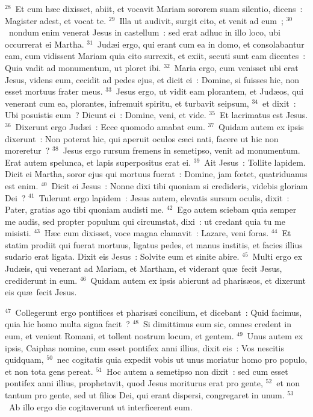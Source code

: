 ${}^{28}$~Et cum h\ae c dixisset, abiit, et vocavit Mariam sororem suam silentio, dicens~: Magister adest, et vocat te.
${}^{29}$~Illa ut audivit, surgit cito, et venit ad eum~;
${}^{30}$~nondum enim venerat Jesus in castellum~: sed erat adhuc in illo loco, ubi occurrerat ei Martha.
${}^{31}$~Jud\ae i ergo, qui erant cum ea in domo, et consolabantur eam, cum vidissent Mariam quia cito surrexit, et exiit, secuti sunt eam dicentes~: Quia vadit ad monumentum, ut ploret ibi.
${}^{32}$~Maria ergo, cum venisset ubi erat Jesus, videns eum, cecidit ad pedes ejus, et dicit ei~: Domine, si fuisses hic, non esset mortuus frater meus.
${}^{33}$~Jesus ergo, ut vidit eam plorantem, et Jud\ae os, qui venerant cum ea, plorantes, infremuit spiritu, et turbavit seipsum,
${}^{34}$~et dixit~: Ubi posuistis eum~? Dicunt ei~: Domine, veni, et vide.
${}^{35}$~Et lacrimatus est Jesus.
${}^{36}$~Dixerunt ergo Jud\ae i~: Ecce quomodo amabat eum.
${}^{37}$~Quidam autem ex ipsis dixerunt~: Non poterat hic, qui aperuit oculos c\ae ci nati, facere ut hic non moreretur~?
${}^{38}$~Jesus ergo rursum fremens in semetipso, venit ad monumentum. Erat autem spelunca, et lapis superpositus erat ei.
${}^{39}$~Ait Jesus~: Tollite lapidem. Dicit ei Martha, soror ejus qui mortuus fuerat~: Domine, jam fœtet, quatriduanus est enim.
${}^{40}$~Dicit ei Jesus~: Nonne dixi tibi quoniam si credideris, videbis gloriam Dei~?
${}^{41}$~Tulerunt ergo lapidem~: Jesus autem, elevatis sursum oculis, dixit~: Pater, gratias ago tibi quoniam audisti me.
${}^{42}$~Ego autem sciebam quia semper me audis, sed propter populum qui circumstat, dixi~: ut credant quia tu me misisti.
${}^{43}$~H\ae c cum dixisset, voce magna clamavit~: Lazare, veni foras.
${}^{44}$~Et statim prodiit qui fuerat mortuus, ligatus pedes, et manus institis, et facies illius sudario erat ligata. Dixit eis Jesus~: Solvite eum et sinite abire.
${}^{45}$~Multi ergo ex Jud\ae is, qui venerant ad Mariam, et Martham, et viderant qu\ae\ fecit Jesus, crediderunt in eum.
${}^{46}$~Quidam autem ex ipsis abierunt ad pharis\ae os, et dixerunt eis qu\ae\ fecit Jesus.


${}^{47}$~Collegerunt ergo pontifices et pharis\ae i concilium, et dicebant~: Quid facimus, quia hic homo multa signa facit~?
${}^{48}$~Si dimittimus eum sic, omnes credent in eum, et venient Romani, et tollent nostrum locum, et gentem.
${}^{49}$~Unus autem ex ipsis, Caiphas nomine, cum esset pontifex anni illius, dixit eis~: Vos nescitis quidquam,
${}^{50}$~nec cogitatis quia expedit vobis ut unus moriatur homo pro populo, et non tota gens pereat.
${}^{51}$~Hoc autem a semetipso non dixit~: sed cum esset pontifex anni illius, prophetavit, quod Jesus moriturus erat pro gente,
${}^{52}$~et non tantum pro gente, sed ut filios Dei, qui erant dispersi, congregaret in unum.
${}^{53}$~Ab illo ergo die cogitaverunt ut interficerent eum.


